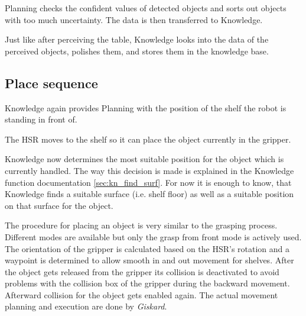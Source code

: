 \documentclass[main.tex]{subfiles}
\begin{document}
	\begin{planning}
	Planning checks the confident values of detected objects and sorts out objects with too much uncertainty. The data is then transferred to Knowledge.
	\end{planning}
	
	\begin{knowledge}
	Just like after perceiving the table, Knowledge looks into the data of the perceived objects, polishes them, and stores them in the knowledge base.
	\end{knowledge}
	
	\subsection{Place sequence}
	
	\begin{knowledge}
	Knowledge again provides Planning with the position of the shelf the robot is standing in front of.
	\end{knowledge}
	
	\begin{navigation}
	The HSR moves to the shelf so it can place the object currently in the gripper.
	\end{navigation}
	
	\begin{knowledge}
	Knowledge now determines the most suitable position for the object which is currently handled. The way this decision is made is explained in the Knowledge function documentation \ref{sec:kn_find_surf}. For now it is enough to know, that Knowledge finds a suitable surface (i.e. shelf floor) as well as a suitable position on that surface for the object.
	\end{knowledge}
	
	\begin{manipulation}
	The procedure for placing an object is very similar to the grasping process. Different modes are available but only the grasp from front mode is actively used. The orientation of the gripper is calculated based on the HSR's rotation and a waypoint is determined to allow smooth in and out movement for shelves. After the object gets released from the gripper its collision is deactivated to avoid problems with the collision box of the gripper during the backward movement. Afterward collision for the object gets enabled again. The actual movement planning and execution are done by \textit{Giskard}.   
	\end{manipulation}
	
\end{document}
